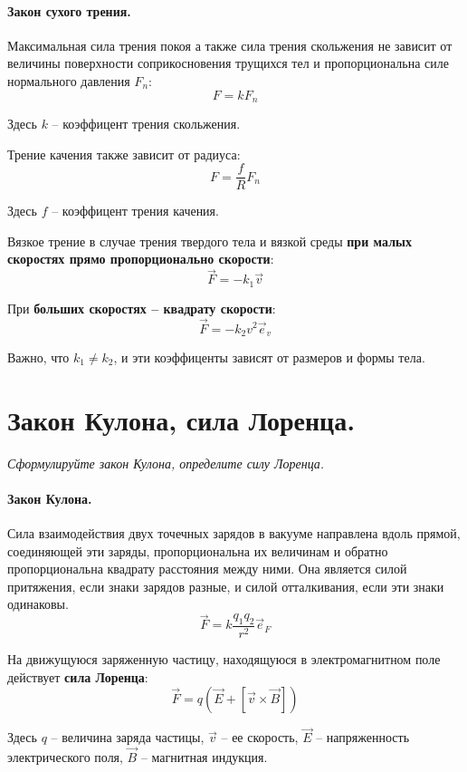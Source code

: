 \documentclass{article}
\begin{document}
    \paragraph{Закон сухого трения.} Максимальная сила трения покоя а также сила трения скольжения не зависит от величины поверхности соприкосновения трущихся тел и пропорциональна силе нормального давления $F_n$:
    \begin{equation}
      F=kF_n
    \end{equation}
    \par
      Здесь $k$ -- коэффицент трения скольжения.
    \par
      Трение качения также зависит от радиуса:
    \begin{equation}
      F=\frac{f}{R}F_n
    \end{equation}
    \par
      Здесь $f$ -- коэффицент трения качения.
    \par
      Вязкое трение в случае трения твердого тела и вязкой среды \textbf{при малых скоростях прямо пропорционально скорости}:
      \begin{equation}
	\vec F = -k_1\vec v
      \end{equation}
    \par
      При \textbf{больших скоростях -- квадрату скорости}:
      \begin{equation}
	\vec F = -k_2v^2\vec e_v
      \end{equation}
    \par
      Важно, что $k_1\neq k_2$, и эти коэффиценты зависят от размеров и формы тела.
  \clearpage
    
  \section{Закон Кулона, сила Лоренца.}
    \par
      \textit{Сформулируйте закон Кулона, определите силу Лоренца.}\\
    \paragraph{Закон Кулона.} Сила взаимодействия двух точечных зарядов в вакууме направлена вдоль прямой, соединяющей эти заряды, пропорциональна их величинам и обратно пропорциональна квадрату расстояния между ними. Она является силой притяжения, если знаки зарядов разные, и силой отталкивания, если эти знаки одинаковы.
    \begin{equation}
      \vec F=k\frac{q_1q_2}{r^2}\vec e_F
    \end{equation}
    \par
      На движущуюся заряженную частицу, находящуюся в электромагнитном поле действует \textbf{сила Лоренца}:
    \begin{equation}
      \vec F=q(\vec E+[\vec v\times \vec B])
    \end{equation}
    \par
      Здесь $q$ -- величина заряда частицы, $\vec v$ -- ее скорость, $\vec E$ -- напряженность электрического поля, $\vec B$ -- магнитная индукция.
  \clearpage    
\end{document}
